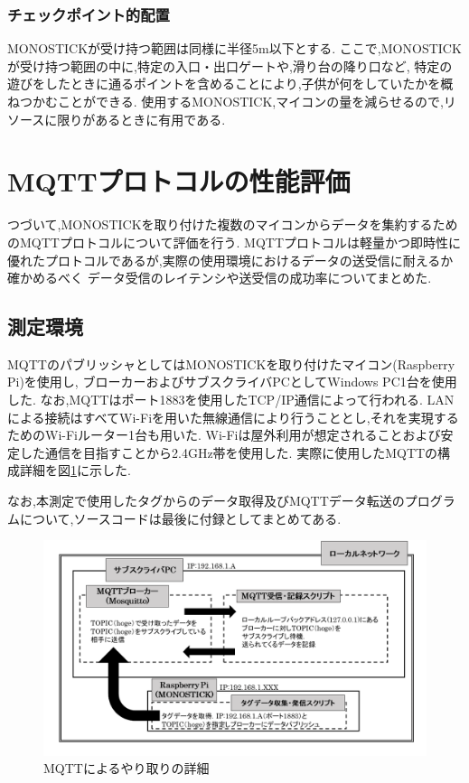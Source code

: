 \subsubsection{チェックポイント的配置}
MONOSTICKが受け持つ範囲は同様に半径5m以下とする.
ここで,MONOSTICKが受け持つ範囲の中に,特定の入口・出口ゲートや,滑り台の降り口など,
特定の遊びをしたときに通るポイントを含めることにより,子供が何をしていたかを概ねつかむことができる.
使用するMONOSTICK,マイコンの量を減らせるので,リソースに限りがあるときに有用である.

\clearpage


\section{MQTTプロトコルの性能評価}
つづいて,MONOSTICKを取り付けた複数のマイコンからデータを集約するためのMQTTプロトコルについて評価を行う.
MQTTプロトコルは軽量かつ即時性に優れたプロトコルであるが,実際の使用環境におけるデータの送受信に耐えるか確かめるべく
データ受信のレイテンシや送受信の成功率についてまとめた.

\subsection{測定環境}
MQTTのパブリッシャとしてはMONOSTICKを取り付けたマイコン(Raspberry Pi)を使用し,
ブローカーおよびサブスクライバPCとしてWindows PC1台を使用した.
なお,MQTTはポート1883を使用したTCP/IP通信によって行われる.
LANによる接続はすべてWi-Fiを用いた無線通信により行うこととし,それを実現するためのWi-Fiルーター1台も用いた.
Wi-Fiは屋外利用が想定されることおよび安定した通信を目指すことから2.4GHz帯を使用した.
実際に使用したMQTTの構成詳細を図\ref{MQTTprop}に示した.

なお,本測定で使用したタグからのデータ取得及びMQTTデータ転送のプログラムについて,ソースコードは最後に付録としてまとめてある.

\clearpage

\begin{figure}[htb]
  \centering
   \includegraphics[width = 15.8cm, bb= 0 0 1000 600]{chapter3/MQTTprop.png}
   \caption{MQTTによるやり取りの詳細}
   \label{MQTTprop}
\end{figure}


